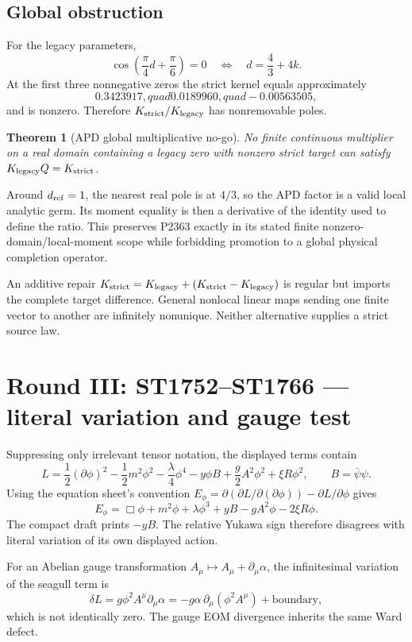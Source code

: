\documentclass[11pt,a4paper]{article}
\newtheorem{theorem}{Theorem}\newcommand{\status}[1]{\textsf{[#1]}}
\begin{document}
\subsection{Global obstruction}

For the legacy parameters,
\[
\cos\left(\frac\pi4d+\frac\pi6\right)=0
\quad\Longleftrightarrow\quad
d=\frac43+4k.
\]
At the first three nonnegative zeros the strict kernel equals approximately
\[
0.3423917,quad0.0189960,quad-0.00563505,
\]
and is nonzero.  Therefore $K_{\rm strict}/K_{\rm legacy}$ has nonremovable
poles.

\begin{theorem}[APD global multiplicative no-go]
No finite continuous multiplier on a real domain containing a legacy zero with
nonzero strict target can satisfy
$K_{\rm legacy}Q=K_{\rm strict}$.
\end{theorem}

Around $d_{\rm ref}=1$, the nearest real pole is at $4/3$, so the APD factor is
a valid local analytic germ.  Its moment equality is then a derivative of the
identity used to define the ratio.  This preserves P2363 exactly in its stated
finite nonzero-domain/local-moment scope while forbidding promotion to a global
physical completion operator.

An additive repair
$K_{\rm strict}=K_{\rm legacy}+(K_{\rm strict}-K_{\rm legacy})$ is regular but
imports the complete target difference.  General nonlocal linear maps sending
one finite vector to another are infinitely nonunique.  Neither alternative
supplies a strict source law.

\section{Round III: ST1752--ST1766 --- literal variation and gauge test}

Suppressing only irrelevant tensor notation, the displayed terms contain
\[
L=\frac12(\partial\phi)^2-\frac12m^2\phi^2-\frac\lambda4\phi^4
-y\phi B+\frac g2A^2\phi^2+\xi R\phi^2,
\qquad B=\bar\psi\psi.
\]
Using the equation sheet's convention
$E_\phi=\partial(\partial L/\partial(\partial\phi))-\partial L/\partial\phi$
gives
\[
E_\phi=\Box\phi+m^2\phi+\lambda\phi^3
+yB-gA^2\phi-2\xi R\phi.
\]
The compact draft prints $-yB$.  The relative Yukawa sign therefore disagrees
with literal variation of its own displayed action.

For an Abelian gauge transformation
$A_\mu\mapsto A_\mu+\partial_\mu\alpha$, the infinitesimal variation of the
seagull term is
\[
\delta L=g\phi^2A^\mu\partial_\mu\alpha
=-g\alpha\,\partial_\mu(\phi^2A^\mu)+\text{boundary},
\]
which is not identically zero.  The gauge EOM divergence inherits the same
Ward defect.
\end{document}
